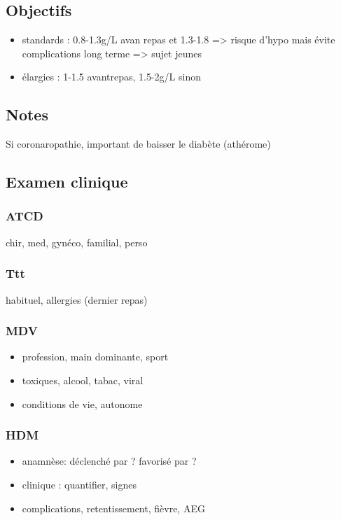 \documentclass[11pt]{article}
\begin{document}
\subsection{Objectifs}
\label{sec:org526d974}
\begin{itemize}
\item standards : 0.8-1.3g/L avan repas et 1.3-1.8 => risque d'hypo mais évite
complications long terme => sujet jeunes
\item élargies :  1-1.5 avantrepas, 1.5-2g/L sinon
\end{itemize}
\subsection{Notes}
\label{sec:org7caa7ec}
Si coronaropathie, important de baisser le diabète (athérome)
\subsection{Examen clinique}
\label{sec:orge52bbb4}
\subsubsection{ATCD}
\label{sec:org6d05b54}
chir, med, gynéco, familial, perso
\subsubsection{Ttt}
\label{sec:orgf5f8941}
habituel, allergies (dernier repas)
\subsubsection{MDV}
\label{sec:org04c4813}
\begin{itemize}
\item profession, main dominante, sport
\item toxiques, alcool, tabac, viral
\item conditions de vie, autonome
\end{itemize}
\subsubsection{HDM}
\label{sec:org8344aa5}
\begin{itemize}
\item anamnèse: déclenché par ? favorisé par ?
\item clinique : quantifier, signes
\item complications, retentissement, fièvre, AEG
\end{itemize}
\end{document}
